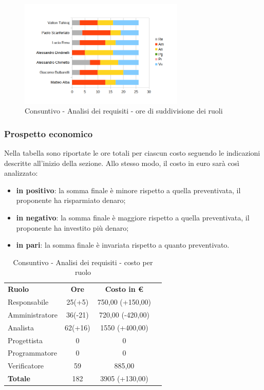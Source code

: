 	\begin{figure} [h!]
	\centering
	\includegraphics[width=0.7\textwidth]{res/img/grafici/consuntivo-barre_ ore analisi requisiti.png}
	\caption{Consuntivo - Analisi dei requisiti - ore di suddivisione dei ruoli} 
\end{figure}


\newpage
\subsubsection{Prospetto economico}
Nella tabella sono riportate le ore totali per ciascun costo seguendo le indicazioni descritte all'inizio della sezione.
Allo stesso modo, il costo in euro sarà così analizzato:
\begin{itemize}
	\item {\bfseries in positivo}: la somma finale è minore rispetto a quella preventivata, il proponente ha risparmiato denaro;
	\item {\bfseries in negativo}: la somma finale è maggiore rispetto a quella preventivata, il proponente ha investito più denaro;
	\item {\bfseries in pari}: la somma finale è invariata rispetto a quanto preventivato. \\
\end{itemize}
\begin{table} [h!]
	\begin{center}
		\begin{tabular} { m{3 cm} c c c  }
			\rowcolor{lightgray}
			\textbf{Ruolo} & \textbf{Ore} & \textbf{Costo in \euro} \\
			Responsabile & 25(+5) & 750,00 (+150,00) \\
			Amministratore & 36(-21) & 720,00 (-420,00)  \\
			Analista & 62(+16) & 1550 (+400,00) \\
			Progettista & 0 & 0 \\
			Programmatore & 0 & 0  \\
			Verificatore & 59 & 885,00  \\
			\textbf{Totale} & 182  & 3905 (+130,00) \\
			
		\end{tabular}
		\caption{Consuntivo - Analisi dei requisiti - costo per ruolo}
	\end{center}
\end{table}

